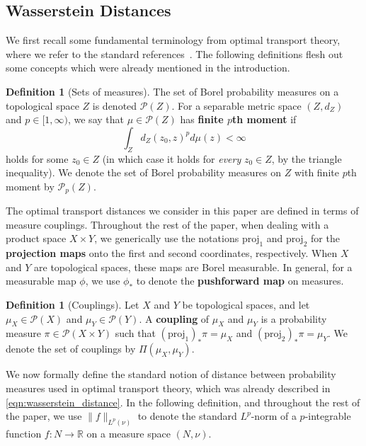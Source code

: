 \documentclass{article}
\theoremstyle{definition}
\newtheorem{definition}[proposition]{Definition}
\newcommand{\R}{\mathbb{R}}
\newcommand{\WZ}{\mathcal{P}_p(Z)}
\begin{document}
\subsection{Wasserstein Distances}

We first recall some fundamental terminology from optimal transport theory, where we refer to the standard references~\cite{villani2008optimal,villani2021topics}. The following definitions flesh out some concepts which were already mentioned in the introduction.

\begin{definition}[Sets of measures]
    The set of Borel probability measures on a topological space $Z$ is denoted $\mathcal{P}(Z)$. For a separable metric space $(Z,d_Z)$ and $p \in [1,\infty)$, we say that $\mu \in \mathcal{P}(Z)$ has \textbf{finite $p$th moment} if 
    \[
    \int_Z d_Z(z_0,z)^p d\mu(z) < \infty
    \]
    holds for some $z_0 \in Z$ (in which case it holds for \emph{every} $z_0 \in Z$, by the triangle inequality).
    We denote the set of Borel probability measures on $Z$ with finite $p$th moment by $\WZ$. 
\end{definition}

The optimal transport distances we consider in this paper are defined in terms of measure couplings. Throughout the rest of the paper, when dealing with a product space $X \times Y$, we generically use the notations $\mathrm{proj}_1$ and $\mathrm{proj}_2$ for the \textbf{projection maps} onto the first and second coordinates, respectively. When $X$ and $Y$ are topological spaces, these maps are Borel measurable. In general, for a measurable map $\phi$, we use $\phi_\ast$ to denote the \textbf{pushforward map} on measures.

\begin{definition}[Couplings]\label{def:coupling}
Let $X$ and $Y$ be topological spaces, and let $\mu_X\in\mathcal{P}(X)$ and $\mu_Y\in\mathcal{P}(Y)$.
A \textbf{coupling} of $\mu_X$ and $\mu_Y$ is a probability measure $\pi\in\mathcal{P}(X\times Y)$ such that
$(\mathrm{proj}_1)_\ast \pi=\mu_X$ and $(\mathrm{proj}_2)_\ast \pi=\mu_Y$.
We denote the set of couplings by $\Pi(\mu_X,\mu_Y)$.
\end{definition}

We now formally define the standard notion of distance between probability measures used in optimal transport theory, which was already described in \eqref{eqn:wasserstein_distance}. In the following definition, and throughout the rest of the paper, we use $\|f\|_{L^p(\nu)}$ to denote the standard $L^p$-norm of a $p$-integrable function $f:N \to \R$ on a measure space $(N,\nu)$. 
\end{document}
